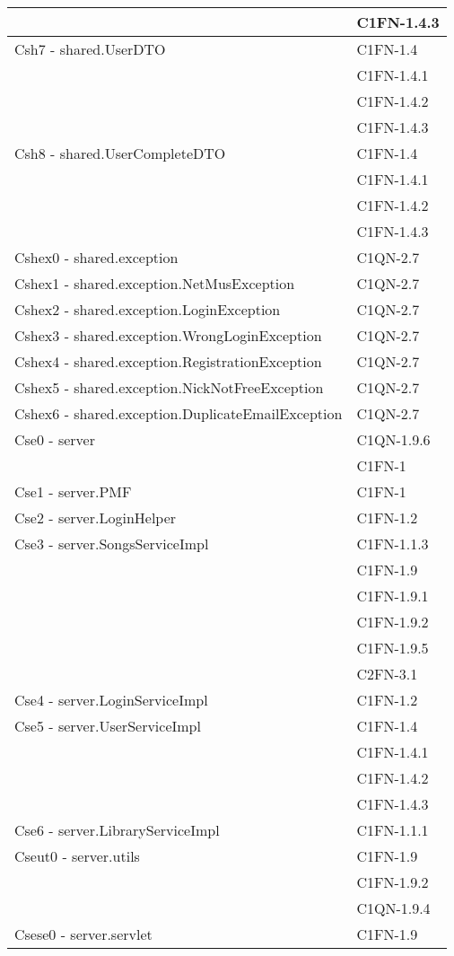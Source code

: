 \begin{footnotesize}
\begin{longtable}[!h]{|l|l|}
& C1FN-1.4.3 \\\hline
Csh7 - shared.UserDTO & C1FN-1.4 \\
& C1FN-1.4.1 \\
& C1FN-1.4.2 \\
& C1FN-1.4.3 \\\hline
Csh8 - shared.UserCompleteDTO & C1FN-1.4 \\
& C1FN-1.4.1 \\
& C1FN-1.4.2 \\
& C1FN-1.4.3 \\\hline
Cshex0 - shared.exception & C1QN-2.7 \\\hline
Cshex1 - shared.exception.NetMusException & C1QN-2.7 \\\hline
Cshex2 - shared.exception.LoginException & C1QN-2.7 \\\hline
Cshex3 - shared.exception.WrongLoginException & C1QN-2.7 \\\hline
Cshex4 - shared.exception.RegistrationException & C1QN-2.7 \\\hline
Cshex5 - shared.exception.NickNotFreeException & C1QN-2.7 \\\hline
Cshex6 - shared.exception.DuplicateEmailException & C1QN-2.7 \\\hline
Cse0 - server & C1QN-1.9.6 \\
&  C1FN-1 \\\hline
Cse1 - server.PMF & C1FN-1 \\\hline
Cse2 - server.LoginHelper & C1FN-1.2 \\\hline
Cse3 - server.SongsServiceImpl & C1FN-1.1.3 \\
& C1FN-1.9 \\
& C1FN-1.9.1 \\
& C1FN-1.9.2 \\
& C1FN-1.9.5 \\
& C2FN-3.1 \\\hline
Cse4 - server.LoginServiceImpl & C1FN-1.2 \\\hline
Cse5 - server.UserServiceImpl & C1FN-1.4 \\
& C1FN-1.4.1 \\
& C1FN-1.4.2 \\
& C1FN-1.4.3 \\\hline
Cse6 - server.LibraryServiceImpl & C1FN-1.1.1 \\\hline
Cseut0 - server.utils & C1FN-1.9 \\
& C1FN-1.9.2 \\
& C1QN-1.9.4 \\\hline
Csese0 - server.servlet & C1FN-1.9 \\\hline

\end{longtable}
\end{footnotesize}
